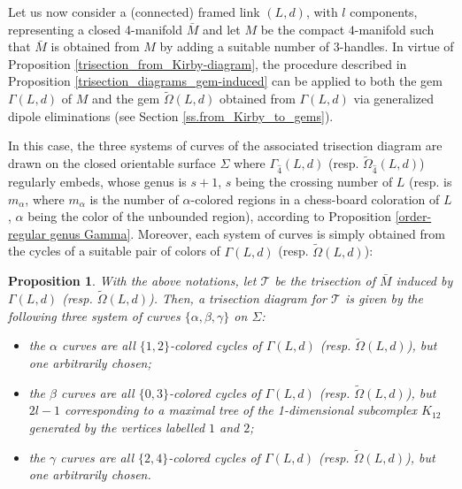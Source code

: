 \documentclass[12pt,a4paper]{article}
\newtheorem{proposition}[lemma]{Proposition}
\begin{document}
\bigskip


Let us now consider a (connected) framed link $(L,d)$, with $l$ components, representing a closed 4-manifold $\bar M$ and let $M$ be the compact $4$-manifold such that $\bar M$ is obtained from $M$ by adding a suitable number of 3-handles. In virtue of Proposition \ref{trisection_from_Kirby-diagram}, the procedure described in Proposition \ref{trisection_diagrams_gem-induced}  can be applied to both the gem $\Gamma(L,d)$ of $M$ and the gem $\tilde \Omega(L,d)$ obtained from $\Gamma(L,d)$ via generalized dipole eliminations (see Section \ref{ss.from_Kirby_to_gems}).

In this case, the three systems of curves of the associated trisection diagram are drawn on the closed orientable surface $\Sigma$  where $\Gamma_{\hat 4}(L,d)$ (resp. $\tilde \Omega_{\hat 4}(L,d)$) regularly embeds, whose genus is $s+1$, $s$ being the crossing number of $L$ (resp. is $m_\alpha$, where $m_\alpha$  is the number of $\alpha$-colored regions in a chess-board coloration of $L$, $\alpha$ being the color of the unbounded region), according to Proposition \ref{order-regular genus Gamma}. Moreover, each system of curves is simply obtained from the cycles of a suitable pair of colors of $\Gamma(L,d)$ (resp. $\tilde\Omega(L,d)$): 

\begin{proposition} \label{trisection_diagrams_framed-links}
With the above notations, let $\mathcal T$ be the trisection of $\bar M$ induced by $\Gamma(L,d)$ (resp. $\tilde \Omega(L,d)$). Then, a trisection diagram for $\mathcal  T$ is given by the following three system of curves $\{ \alpha, \beta, \gamma\}$ on $\Sigma$:

\begin{itemize}
\item[-]   the $\alpha$ curves are all $\{1,2\}$-colored cycles of $\Gamma(L,d)$ (resp. $\tilde\Omega(L,d)$), but one arbitrarily chosen; 
  
\item[-] the $\beta$ curves are all $\{0,3\}$-colored cycles of $\Gamma(L,d)$ (resp. $\tilde\Omega(L,d)$),  but $2l-1$ corresponding to a maximal tree of the 1-dimensional subcomplex $K_{12}$ generated by the vertices labelled $1$ and $2$; 

\item[-] the $\gamma$ curves are all $\{2,4\}$-colored cycles of $\Gamma(L,d)$ (resp. $\tilde\Omega(L,d)$), but one arbitrarily chosen. 
\end{itemize}
\end{proposition} 
\end{document}
